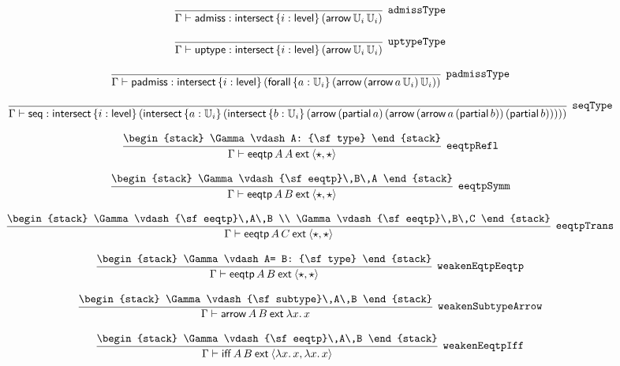 \[
\infer[{\tt admissType}]{\Gamma \vdash {\sf admiss}: {\sf intersect}\,\{i : {\sf level}\}\,({\sf arrow}\,{\Bbb U}_{i}\,{\Bbb U}_{i})}{}
\]

\[
\infer[{\tt uptypeType}]{\Gamma \vdash {\sf uptype}: {\sf intersect}\,\{i : {\sf level}\}\,({\sf arrow}\,{\Bbb U}_{i}\,{\Bbb U}_{i})}{}
\]

\[
\infer[{\tt padmissType}]{\Gamma \vdash {\sf padmiss}: {\sf intersect}\,\{i : {\sf level}\}\,({\sf forall}\,\{a : {\Bbb U}_{i}\}\,({\sf arrow}\,({\sf arrow}\,a\,{\Bbb U}_{i})\,{\Bbb U}_{i}))}{}
\]

\[
\infer[{\tt seqType}]{\Gamma \vdash {\sf seq}: {\sf intersect}\,\{i : {\sf level}\}\,({\sf intersect}\,\{a : {\Bbb U}_{i}\}\,({\sf intersect}\,\{b : {\Bbb U}_{i}\}\,({\sf arrow}\,({\sf partial}\,a)\,({\sf arrow}\,({\sf arrow}\,a\,({\sf partial}\,b))\,({\sf partial}\,b)))))}{}
\]

\[
\infer[{\tt eeqtpRefl}]{\Gamma \vdash {\sf eeqtp}\,A\,A\:{\sf ext}\:\langle \star ,\star \rangle }{
\begin{stack}
\Gamma \vdash A: {\sf type}
\end{stack}}
\]

\[
\infer[{\tt eeqtpSymm}]{\Gamma \vdash {\sf eeqtp}\,A\,B\:{\sf ext}\:\langle \star ,\star \rangle }{
\begin{stack}
\Gamma \vdash {\sf eeqtp}\,B\,A
\end{stack}}
\]

\[
\infer[{\tt eeqtpTrans}]{\Gamma \vdash {\sf eeqtp}\,A\,C\:{\sf ext}\:\langle \star ,\star \rangle }{
\begin{stack}
\Gamma \vdash {\sf eeqtp}\,A\,B
\\
\Gamma \vdash {\sf eeqtp}\,B\,C
\end{stack}}
\]

\[
\infer[{\tt weakenEqtpEeqtp}]{\Gamma \vdash {\sf eeqtp}\,A\,B\:{\sf ext}\:\langle \star ,\star \rangle }{
\begin{stack}
\Gamma \vdash A= B: {\sf type}
\end{stack}}
\]

\[
\infer[{\tt weakenSubtypeArrow}]{\Gamma \vdash {\sf arrow}\,A\,B\:{\sf ext}\:\lambda x.\,x}{
\begin{stack}
\Gamma \vdash {\sf subtype}\,A\,B
\end{stack}}
\]

\[
\infer[{\tt weakenEeqtpIff}]{\Gamma \vdash {\sf iff}\,A\,B\:{\sf ext}\:\langle \lambda x.\,x,\lambda x.\,x\rangle }{
\begin{stack}
\Gamma \vdash {\sf eeqtp}\,A\,B
\end{stack}}
\]

